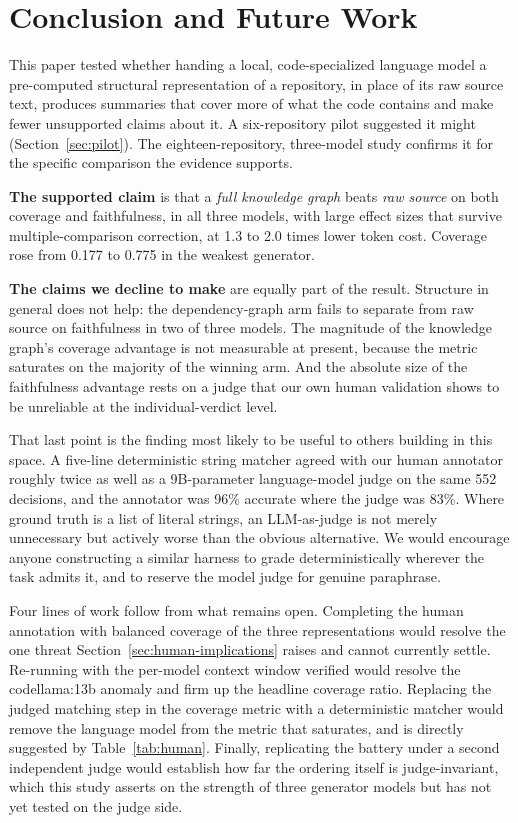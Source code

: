 \documentclass[conference]{IEEEtran}
\begin{document}
\section{Conclusion and Future Work}
\label{sec:futurework}

This paper tested whether handing a local, code-specialized language model a pre-computed
structural representation of a repository, in place of its raw source text, produces summaries
that cover more of what the code contains and make fewer unsupported claims about it. A
six-repository pilot suggested it might (Section~\ref{sec:pilot}). The eighteen-repository,
three-model study confirms it for the specific comparison the evidence supports.

\textbf{The supported claim} is that a \emph{full knowledge graph} beats \emph{raw source} on
both coverage and faithfulness, in all three models, with large effect sizes that survive
multiple-comparison correction, at 1.3 to 2.0 times lower token cost. Coverage rose from 0.177
to 0.775 in the weakest generator.

\textbf{The claims we decline to make} are equally part of the result. Structure in general does
not help: the dependency-graph arm fails to separate from raw source on faithfulness in two of
three models. The magnitude of the knowledge graph's coverage advantage is not measurable at
present, because the metric saturates on the majority of the winning arm. And the absolute size
of the faithfulness advantage rests on a judge that our own human validation shows to be
unreliable at the individual-verdict level.

That last point is the finding most likely to be useful to others building in this space. A
five-line deterministic string matcher agreed with our human annotator roughly twice as well as
a 9B-parameter language-model judge on the same 552 decisions, and the annotator was 96\%
accurate where the judge was 83\%. Where ground truth is a list of literal strings, an
LLM-as-judge is not merely unnecessary but actively worse than the obvious alternative. We would
encourage anyone constructing a similar harness to grade deterministically wherever the task
admits it, and to reserve the model judge for genuine paraphrase.

Four lines of work follow from what remains open. Completing the human annotation with balanced
coverage of the three representations would resolve the one threat
Section~\ref{sec:human-implications} raises and cannot currently settle. Re-running with the
per-model context window verified would resolve the codellama:13b anomaly and firm up the
headline coverage ratio. Replacing the judged matching step in the coverage metric with a
deterministic matcher would remove the language model from the metric that saturates, and is
directly suggested by Table~\ref{tab:human}. Finally, replicating the battery under a second
independent judge would establish how far the ordering itself is judge-invariant, which this
study asserts on the strength of three generator models but has not yet tested on the judge side.
\end{document}
